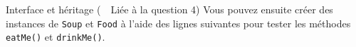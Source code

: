 \begin{Exercice}[15 minutes]{Interface et héritage (\faLink~~Liée à la question 4)}
Vous pouvez ensuite créer des instances de \lstinline{Soup} et \lstinline{Food} à l'aide des lignes suivantes pour tester les méthodes \lstinline{eatMe()} et \lstinline{drinkMe()}.
 

\begin{solution}
 
\end{solution}
\begin{solution}
 
\end{solution}
\begin{solution}
 
\end{solution}
\begin{solution}
 
\end{solution}

\end{Exercice}


